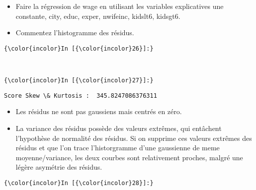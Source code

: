 \documentclass[11pt]{article}
\begin{document}
\begin{itemize}
\item
  Faire la régression de wage en utilisant les variables explicatives
  une constante, city, educ, exper, nwifeinc, kidslt6, kidsgt6. 
\item
  Commentez l'histogramme des résidus.
\end{itemize}

    \begin{Verbatim}[commandchars=\\\{\}]
{\color{incolor}In [{\color{incolor}26}]:} 
\end{Verbatim}


    \begin{center}
    \end{center}
    { \hspace*{\fill} \\}
    
    \begin{Verbatim}[commandchars=\\\{\}]
{\color{incolor}In [{\color{incolor}27}]:} 
\end{Verbatim}


    \begin{Verbatim}[commandchars=\\\{\}]
Score Skew \& Kurtosis :  345.8247086376311

    \end{Verbatim}

    \begin{itemize}
\item
  Les résidus ne sont pas gaussiens mais centrés en zéro.
\item
  La variance des résidus possède des valeurs extrêmes, qui entâchent
  l'hypothèse de normalité des résidus. Si on supprime ces valeurs
  extrêmes des résidus et que l'on trace l'historgramme d'une gaussienne
  de meme moyenne/variance, les deux courbes sont relativement proches,
  malgré une légère asymétrie des résidus.
\end{itemize}

    \begin{Verbatim}[commandchars=\\\{\}]
{\color{incolor}In [{\color{incolor}28}]:} 
\end{Verbatim}
\end{document}
